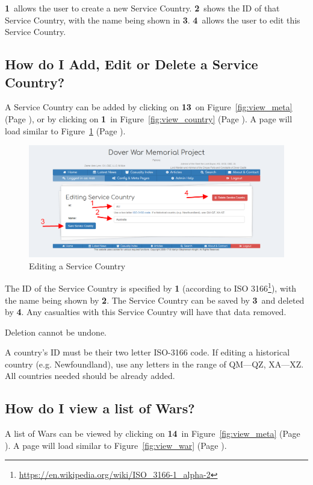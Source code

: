 \documentclass[12pt]{article}
\newcommand{\marker}[1]{\color{red}\textbf{#1}\color{black}}
\newcommand{\myref}[1]{\ref{#1} {\scriptsize(Page \pageref{#1})}}
\begin{document}
\marker{1}\ allows the user to create a new Service Country. \marker{2}\ shows the ID of that Service Country, with the name being shown in \marker{3}. \marker{4}\ allows the user to edit this Service Country.

\newpage
\FloatBarrier
\subsection{How do I Add, Edit or Delete a Service Country?} \label{ssec:edit_country}

A Service Country can be added by clicking on \marker{13}\ on Figure~\myref{fig:view_meta}, or by clicking on \marker{1}\ in Figure~\myref{fig:view_country}. A page will load similar to Figure~\myref{fig:edit_country}.

\begin{figure}[h]
  \centering
 \includegraphics[width=.9\textwidth]{pics/edit_country.png}
	\caption{Editing a Service Country}\label{fig:edit_country}
\end{figure}

The ID of the Service Country is specified by \marker{1} (according to ISO 3166\footnote{\url{https://en.wikipedia.org/wiki/ISO_3166-1_alpha-2}}), with the name being shown by \marker{2}. The Service Country can be saved by \marker{3}\ and deleted by \marker{4}. Any casualties with this Service Country will have that data removed.

\begin{warningBox}
Deletion cannot be undone.
\end{warningBox} 

\begin{infoBox}
A country's ID must be their two letter ISO-3166 code. If editing a historical country (e.g. Newfoundland), use any letters in the range of QM---QZ, XA---XZ. All countries needed should be already added.
\end{infoBox}

\newpage
\FloatBarrier
\subsection{How do I view a list of Wars?} \label{ssec:view_war}
A list of Wars can be viewed by clicking on \marker{14}\ in Figure~\myref{fig:view_meta}. A page will load similar to Figure~\myref{fig:view_war}.
\end{document}
